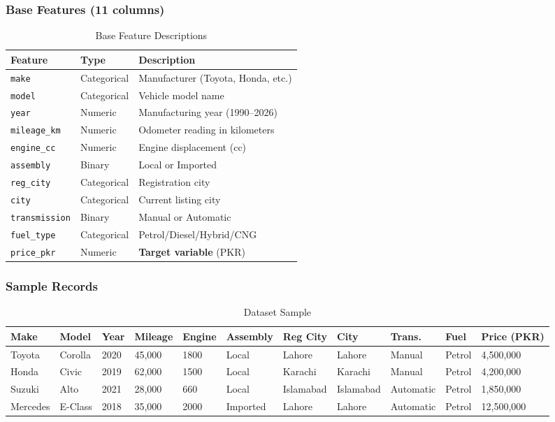 \documentclass[12pt,a4paper]{article}
\begin{document}
\subsubsection{Base Features (11 columns)}

\begin{table}[H]
\centering
\caption{Base Feature Descriptions}
\small
\begin{tabular}{@{}p{3cm}p{2.5cm}p{6cm}@{}}
\toprule
\textbf{Feature} & \textbf{Type} & \textbf{Description} \\ \midrule
\texttt{make}         & Categorical & Manufacturer (Toyota, Honda, etc.) \\
\texttt{model}        & Categorical & Vehicle model name \\
\texttt{year}         & Numeric     & Manufacturing year (1990--2026) \\
\texttt{mileage\_km}  & Numeric     & Odometer reading in kilometers \\
\texttt{engine\_cc}   & Numeric     & Engine displacement (cc) \\
\texttt{assembly}     & Binary      & Local or Imported \\
\texttt{reg\_city}    & Categorical & Registration city \\
\texttt{city}         & Categorical & Current listing city \\
\texttt{transmission} & Binary      & Manual or Automatic \\
\texttt{fuel\_type}   & Categorical & Petrol/Diesel/Hybrid/CNG \\
\texttt{price\_pkr}   & Numeric     & \textbf{Target variable} (PKR) \\ \bottomrule
\end{tabular}
\end{table}

\subsubsection{Sample Records}

\begin{table}[H]
\centering
\caption{Dataset Sample}
\tiny
\begin{tabular}{@{}lllllllllll@{}}
\toprule
\textbf{Make} & \textbf{Model} & \textbf{Year} & \textbf{Mileage} & \textbf{Engine} & \textbf{Assembly} & \textbf{Reg City} & \textbf{City} & \textbf{Trans.} & \textbf{Fuel} & \textbf{Price (PKR)} \\ \midrule
Toyota   & Corolla & 2020 & 45,000 & 1800 & Local    & Lahore    & Lahore    & Manual    & Petrol & 4,500,000  \\
Honda    & Civic   & 2019 & 62,000 & 1500 & Local    & Karachi   & Karachi   & Manual    & Petrol & 4,200,000  \\
Suzuki   & Alto    & 2021 & 28,000 & 660  & Local    & Islamabad & Islamabad & Automatic & Petrol & 1,850,000  \\
Mercedes & E-Class & 2018 & 35,000 & 2000 & Imported & Lahore    & Lahore    & Automatic & Petrol & 12,500,000 \\ \bottomrule
\end{tabular}
\end{table}
\end{document}
